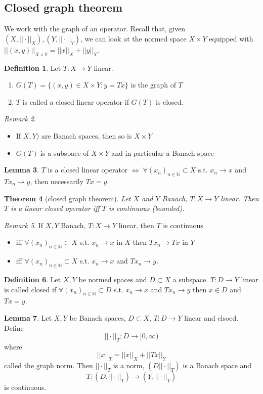 \documentclass[a4paper, 12pt]{article}
\theoremstyle{plain}
\newtheorem{theorem}{Theorem}[subsection] %
\theoremstyle{definition}
\newtheorem{definition}[theorem]{Definition} %
\theoremstyle{lemma}
\newtheorem{lemma}[theorem]{Lemma}
\theoremstyle{remark}
\newtheorem{remark}[theorem]{Remark}
\theoremstyle{corollary}
\theoremstyle{example}
\begin{document}
	\subsection{Closed graph theorem}
	We work with the graph of an operator. Recall that, given $(X, ||\cdot ||_X), (Y, ||\cdot ||_Y)$, we can look at the normed space $X\times Y$ equipped with $||(x,y)||_{X\times Y} = ||x||_X + ||y||_Y$.
	\begin{definition}
		Let $T:X \to Y$ linear. \begin{enumerate}
			\item $G(T) = \{(x,y) \in X \times Y: y = Tx\}$ is the graph of $T$
			\item $T$ is called a closed linear operator if $G(T)$ is closed.
		\end{enumerate}
	\end{definition}
	\begin{remark}
		\begin{itemize}
			\item If $X,Y)$ are Banach spaces, then so is $X\times Y$
			\item $G(T)$ is a subspace of $X\times Y$ and in particular a Banach space
		\end{itemize}
	\end{remark}
	\begin{lemma}
		$T$ is a closed linear operator $\iff \; \forall (x_n)_{n \in \mathbb{N}} \subset X$ s.t. $x_n \to x$ and $Tx_n \to y$, then necessarily $Tx = y$. 
	\end{lemma}
	\begin{theorem}[closed graph theorem]
		Let $X$ and $Y$ Banach, $T:X\to Y$ linear. Then $T$ is a linear closed operator iff $T$ is continuous (bounded).
	\end{theorem}
	\begin{remark}
		If $X,Y$ Banach, $T:X \to Y$ linear, then $T$ is continuous \begin{itemize}
			\item iff $\forall (x_n)_{n\in \mathbb{N}} \subset X$ s.t. $x_n \to x$ in $X$ then $Tx_n \to Tx$ in $Y$
			\item iff $\forall (x_n)_{n \in \mathbb{N}} \subset X$ s.t. $x_n \to x$ and $Tx_n \to y$.
		\end{itemize} 
	\end{remark}
	\begin{definition}
		Let $X,Y$ be normed spaces and $D\subset X$ a subspace. $T:D\to Y$ linear is called closed if $\forall (x_n)_{n \in \mathbb{N}} \subset D$ s.t. $x_n \to x$ and $Tx_n \to y$ then $x \in D$ and $Tx = y$.
	\end{definition}
	\begin{lemma}
		Let $X,Y$ be Banach spaces, $D\subset X$, $T:D \to Y$ linear and clsoed. Define \[||\cdot ||_T : D \to [0,\infty)\] where \[||x||_T = ||x||_X + ||Tx||_Y\] called the graph norm. Then $||\cdot ||_T$ is a norm, $(D||\cdot||_T)$ is a Banach space and \[T: (D,||\cdot||_T) \to (Y,||\cdot||_Y)\] is continuous.
	\end{lemma}
\end{document}
